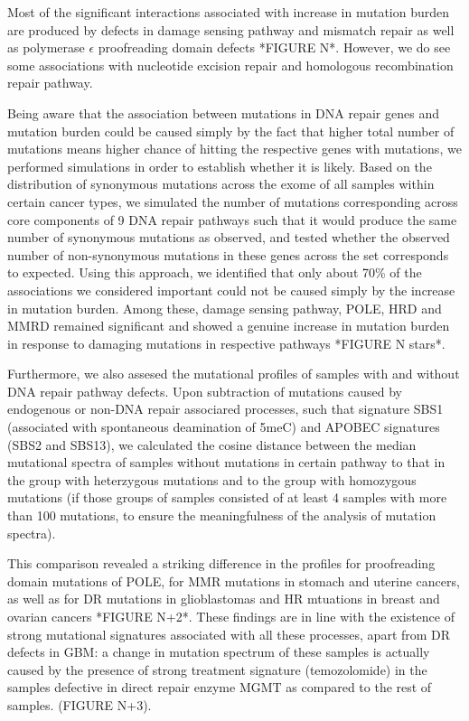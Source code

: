 Most of the significant interactions associated with increase in mutation burden are produced by defects in damage sensing pathway and mismatch repair as well as polymerase $\epsilon$ proofreading domain defects *FIGURE N*. However, we do see some associations with nucleotide excision repair and homologous recombination repair pathway.

Being aware that the association between mutations in DNA repair genes and mutation burden could be caused simply by the fact that higher total number of mutations means higher chance of hitting the respective genes with mutations, we performed simulations in order to establish whether it is likely. Based on the distribution of synonymous mutations across the exome of all samples within certain cancer types, we simulated the number of mutations corresponding across core components of 9 DNA repair pathways such that it would produce the same number of synonymous mutations as observed, and tested whether the observed number of non-synonymous mutations in these genes across the set corresponds to expected. Using this approach, we identified that only about 70\% of the associations we considered important could not be caused simply by the increase in mutation burden. Among these, damage sensing pathway, POLE, HRD and MMRD remained significant and showed a genuine increase in mutation burden in response to damaging mutations in respective pathways *FIGURE N stars*.

Furthermore, we also assesed the mutational profiles of samples with and without DNA repair pathway defects. Upon subtraction of mutations caused by endogenous or non-DNA repair associared processes, such that signature SBS1 (associated with spontaneous deamination of 5meC) and APOBEC signatures (SBS2 and SBS13), we calculated the cosine distance between the median mutational spectra of samples without mutations in certain pathway to that in the group with heterzygous mutations and to the group with homozygous mutations (if those groups of samples consisted of at least 4 samples with more than 100 mutations, to ensure the meaningfulness of the analysis of mutation spectra).

This comparison revealed a striking difference in the profiles for proofreading domain mutations of POLE, for MMR mutations in stomach and uterine cancers, as well as for DR mutations in glioblastomas and HR mtuations in breast and ovarian cancers *FIGURE N+2*. These findings are in line with the existence of strong mutational signatures associated with all these processes, apart from DR defects in GBM: a change in mutation spectrum of these samples is actually caused by the presence of strong treatment signature (temozolomide) in the samples defective in direct repair enzyme MGMT as compared to the rest of samples. (FIGURE N+3).

